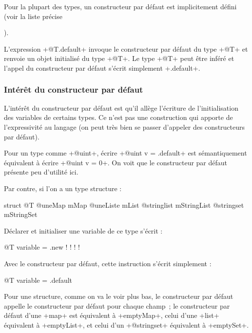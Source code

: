 
Pour la plupart des types, un constructeur par défaut est implicitement défini (voir la liste précise {).


L'expression \ggs+@T.default+ invoque le constructeur par défaut du type \ggs+@T+ et renvoie un objet initialisé du type \ggs+@T+. Le type \ggs+@T+ peut être inféré et l'appel du constructeur par défaut s'écrit simplement \ggs+.default+.

\subsubsection{Intérêt du constructeur par défaut}


L'intérêt du constructeur par défaut est qu'il allège l'écriture de l'initialisation des variables de certains types. Ce n'est pas une construction qui apporte de l'expressivité au langage (on peut très bien se passer d'appeler des constructeurs par défaut).

Pour un type comme \ggs+@uint+, écrire \ggs+@uint v = .default+ est sémantiquement équivalent à écrire \ggs+@uint v = 0+. On voit que le constructeur par défaut présente peu d'utilité ici.

Par contre, si l'on a un type structure :

\begin{galgas}
struct @T {
  @uneMap mMap
  @uneListe mList
  @stringlist mStringList
  @stringset mStringSet
}
\end{galgas}

Déclarer et initialiser une variable de ce type s'écrit :

\begin{galgas}
@T variable = .new {
  !{}
  !{}
  !{}
  !{}
}
\end{galgas}

Avec le constructeur par défaut, cette instruction s'écrit simplement :

\begin{galgas}
@T variable = .default
\end{galgas}

Pour une structure, comme on va le voir plus bas, le constructeur par défaut appelle le constructeur par défaut pour chaque champ~; le constructeur par défaut d'une \ggs+map+ est équivalent à \ggs+emptyMap+, celui d'une \ggs+list+ équivalent à \ggs+emptyList+, et celui d'un \ggs+@stringset+ équivalent à \ggs+emptySet+.


}
